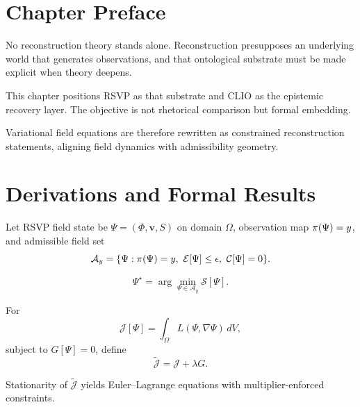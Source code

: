 \section{Chapter Preface}
No reconstruction theory stands alone. Reconstruction presupposes an underlying world that generates observations, and that ontological substrate must be made explicit when theory deepens.

This chapter positions RSVP as that substrate and CLIO as the epistemic recovery layer. The objective is not rhetorical comparison but formal embedding.

Variational field equations are therefore rewritten as constrained reconstruction statements, aligning field dynamics with admissibility geometry.

\section{Derivations and Formal Results}
Let RSVP field state be \(\Psi=(\Phi,\mathbf v,S)\) on domain \(\Omega\), observation map \(\pi(\Psi)=y\), and admissible field set
\[
\mathcal A_y=\{\Psi:\pi(\Psi)=y,\ \mathcal E[\Psi]\le\epsilon,\ \mathcal C[\Psi]=0\}.
\]

\begin{proposition}
\[
\Psi^\star=\arg\min_{\Psi\in\mathcal A_y}\mathcal S[\Psi].
\]
\end{proposition}

\begin{definition}
For
\[
\mathcal J[\Psi]=\int_\Omega L(\Psi,\nabla\Psi)\,dV,
\]
subject to \(G[\Psi]=0\), define
\[
\widetilde{\mathcal J}=\mathcal J+\lambda G.
\]
\end{definition}

\begin{proposition}
Stationarity of \(\widetilde{\mathcal J}\) yields Euler--Lagrange equations with multiplier-enforced constraints.
\end{proposition}

